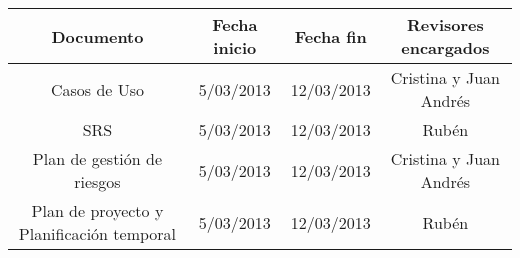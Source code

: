 \documentclass[11pt, a4paper, twoside, titlepage]{article}
\begin{document}
			\begin{center}
				\begin{tabular}{|c |c |c |c |}
				\hline
				\textbf{Documento} & \textbf{Fecha inicio} & \textbf{Fecha fin} &\textbf{Revisores encargados}\\
				\hline
				Casos de Uso & 5/03/2013 & 12/03/2013 & Cristina y Juan Andrés\\
				\hline
				SRS & 5/03/2013 & 12/03/2013 & Rubén\\
				\hline
				Plan de gestión de riesgos & 5/03/2013 & 12/03/2013 & Cristina y Juan Andrés\\
				\hline
				Plan de proyecto y Planificación temporal & 5/03/2013 & 12/03/2013 & Rubén\\
				\hline
				\end{tabular}
			\end{center}
		
\end{document}
